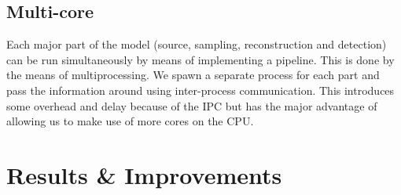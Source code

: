\documentclass[a4paper, openany, oneside]{memoir}
\begin{document}
\subsection{Multi-core}
\label{sec:multi-core}
Each major part of the model (source, sampling, reconstruction and detection) can be run simultaneously by means of implementing a pipeline. This is done by the means of multiprocessing. We spawn a separate process for each part and pass the information around using inter-process communication. This introduces some overhead and delay because of the IPC but has the major advantage of allowing us to make use of more cores on the CPU.


\section{Results \& Improvements}
\label{sec:results}
\end{document}
